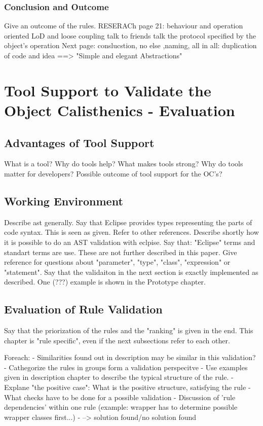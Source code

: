 \subsection{Conclusion and Outcome}
Give an outcome of the rules. RESERACh page 21: 
behaviour and operation oriented
LoD and loose coupling
talk to friends
talk the protocol specified by the object's operation
Next page: conslucstion, no else ,naming, 
all in all: duplication of code and idea
==> "Simple and elegant Abstractions"



\chapter{Tool Support to Validate the Object Calisthenics - Evaluation}
\label{Evaluation}
\section{Advantages of Tool Support}
What is a tool? Why do tools help? What makes tools strong? Why do tools matter for developers?
Possible outcome of tool support for the OC's?
\section{Working Environment}
Describe ast generally. Say that Eclipse provides types representing the parts of code syntax. This is seen as given. 
Refer to other references.
Describe shortly how it is possible to do an AST validation with eclpise. Say that: "Eclipse" terms and standart terms are use. These are not further described in this paper. Give reference for questions about "parameter", "type", "class", "expression" or "statement".
Say that the validaiton in the next section is exactly implemented as described. One (???) example is shown in the Prototype chapter.
\section{Evaluation of Rule Validation}
Say that the priorization of the rules and the "ranking" is given in the end. This chapter is "rule specific", even if the next subsections refer to each other.

Foreach: 
 - Similarities found out in description may be similar in this validation?
 - Cathegorize the rules in groups form a validation perspecitve
 - Use examples given in description chapter to describe the typical structure of the rule. 
 - Explane "the positive case": What is the positive structure, satisfying the rule
 - What checks have to be done for a possible validation
 - Discussion of 'rule dependencies' within one rule (example: wrapper has to determine possible wrapper classes first...)
 - --> solution found/no solution found
 
